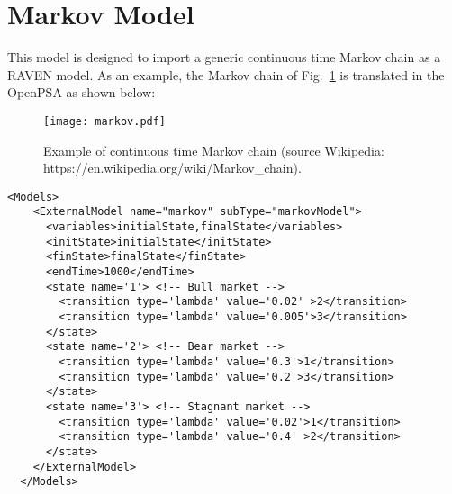 \section{Markov Model}
\label{sec:MarkovModel}

This model is designed to import a generic continuous time Markov chain as a RAVEN model.
As an example, the Markov chain of Fig.~\ref{fig:markov} is translated in the OpenPSA as shown below:

\begin{figure}
    \centering
    \centerline{\texttt{[image: markov.pdf]}} 
    \caption{Example of continuous time Markov chain (source Wikipedia: https://en.wikipedia.org/wiki/Markov\_chain).}
    \label{fig:markov}
\end{figure}

\begin{lstlisting}[style=XML,morekeywords={anAttribute},caption=MarkovModel input example., label=lst:Markov_InputExample]
  <Models>
    <ExternalModel name="markov" subType="markovModel">
      <variables>initialState,finalState</variables>
      <initState>initialState</initState>
      <finState>finalState</finState>
      <endTime>1000</endTime>
      <state name='1'> <!-- Bull market -->
        <transition type='lambda' value='0.02' >2</transition>
        <transition type='lambda' value='0.005'>3</transition>
      </state>
      <state name='2'> <!-- Bear market -->
        <transition type='lambda' value='0.3'>1</transition>
        <transition type='lambda' value='0.2'>3</transition>
      </state>
      <state name='3'> <!-- Stagnant market -->
        <transition type='lambda' value='0.02'>1</transition>
        <transition type='lambda' value='0.4' >2</transition>
      </state>      
    </ExternalModel>
  </Models>
\end{lstlisting}

